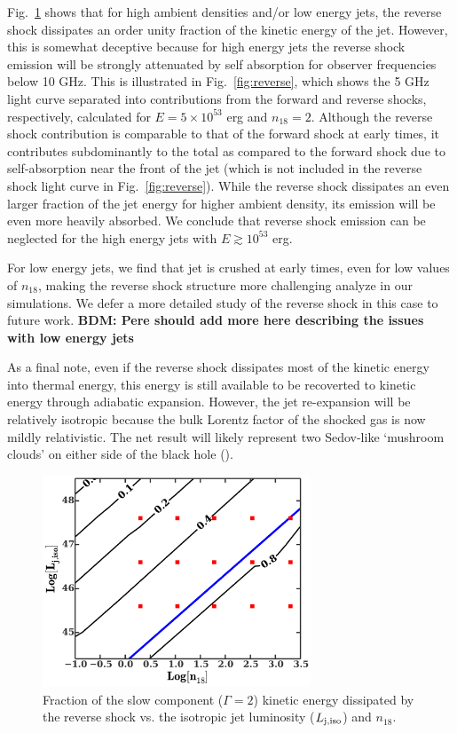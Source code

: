 \documentclass[usenatbib,fleqn]{mnras}
\begin{document}
Fig.~\ref{fig:diss} shows that for high ambient densities and/or low energy jets, the reverse shock dissipates an order unity fraction of the kinetic energy of the jet.  However, this is somewhat deceptive because for high energy jets the reverse shock emission will be strongly attenuated by self absorption for observer frequencies below 10 GHz.  This is illustrated in Fig.~\ref{fig:reverse}, which shows the 5 GHz light curve separated into contributions from the forward and reverse shocks, respectively, calculated for $E = 5\times 10^{53}$ erg and $n_{18} = 2$.  Although the reverse shock contribution is comparable to that of the forward shock at early times, it contributes subdominantly to the total as compared to the forward shock due to self-absorption near the front of the jet (which is not included in the reverse shock light curve in Fig.~\ref{fig:reverse}).  While the reverse shock dissipates an even larger fraction of the jet energy for higher ambient density, its emission will be even more heavily absorbed.  We conclude that reverse shock emission can be neglected for the high energy jets with $E\gtrsim 10^{53}$ erg.

For low energy jets, we find that jet is crushed at early times, even for low values of $n_{18}$, making the reverse shock structure more challenging analyze in our simulations.  We defer a more detailed study of the reverse shock in this case to future work.    {\bf BDM: Pere should add more here describing the issues with low energy jets}

As a final note, even if the reverse shock dissipates most of the kinetic energy into thermal energy, this energy is still available to be recoverted to kinetic energy through adiabatic expansion.  However, the jet re-expansion will be relatively isotropic because the bulk Lorentz factor of the shocked gas is now mildly relativistic.  The net result will likely represent two Sedov-like `mushroom clouds' on either side of the black hole (\citealt{Giannios&Metzger2011}).


\begin{figure}
\includegraphics[width=8cm]{diss.pdf}
\caption{\label{fig:diss} Fraction of the slow component
  ($\Gamma=2$) kinetic energy dissipated by the reverse shock
  vs. the isotropic jet luminosity ($L_{\rm j,iso}$) and $n_{18}$.}
\end{figure}
\end{document}
